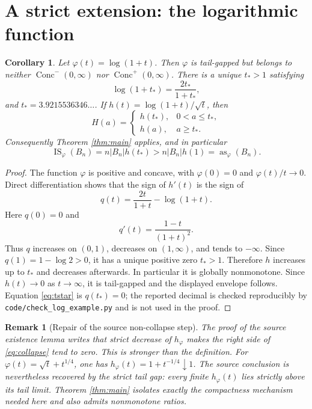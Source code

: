 \documentclass[11pt]{article}
\newtheorem{corollary}[theorem]{Corollary}
\newtheorem{remark}[theorem]{Remark}
\newcommand{\IS}{\operatorname{IS}}
\newcommand{\as}{\operatorname{as}}
\begin{document}
\section{A strict extension: the logarithmic function}

\begin{corollary}\label{cor:log}
Let $\varphi(t)=\log(1+t)$.  Then $\varphi$ is tail-gapped but belongs to
neither $\operatorname{Conc}^{-}(0,\infty)$ nor
$\operatorname{Conc}^{+}(0,\infty)$.  There is a unique $t_*>1$ satisfying
\begin{equation}\label{eq:tstar}
 \log(1+t_*)=\frac{2t_*}{1+t_*},
\end{equation}
and $t_*=3.9215536346\ldots$.  If
$h(t)=\log(1+t)/\sqrt t$, then
\[
 H(a)=
 \begin{cases}
 h(t_*),&0<a\le t_*,\\
 h(a),&a\ge t_*.
 \end{cases}
\]
Consequently Theorem \ref{thm:main} applies, and in particular
\[
 \IS_\varphi(B_n)=n|B_n|h(t_*)
 >n|B_n|h(1)=\as_\varphi(B_n).
\]
\end{corollary}

\begin{proof}
The function $\varphi$ is positive and concave, with $\varphi(0)=0$ and
$\varphi(t)/t\to0$.  Direct differentiation shows that the sign of $h'(t)$
is the sign of
\[
 q(t)=\frac{2t}{1+t}-\log(1+t).
\]
Here $q(0)=0$ and
\[
 q'(t)=\frac{1-t}{(1+t)^2}.
\]
Thus $q$ increases on $(0,1)$, decreases on $(1,\infty)$, and tends to
$-\infty$.  Since $q(1)=1-\log2>0$, it has a unique positive zero $t_*>1$.
Therefore $h$ increases up to $t_*$ and decreases afterwards.  In particular
it is globally nonmonotone.  Since $h(t)\to0$ as $t\to\infty$, it is
tail-gapped and the displayed envelope follows.  Equation \eqref{eq:tstar}
is $q(t_*)=0$; the reported decimal is checked reproducibly by
\texttt{code/check\_log\_example.py} and is not used in the proof.
\end{proof}

\begin{remark}[Repair of the source non-collapse step]
The proof of the source existence lemma writes that strict decrease of
$h_\varphi$ makes the right side of \eqref{eq:collapse} tend to zero.  This is
stronger than the definition.  For
$\varphi(t)=\sqrt t+t^{1/4}$, one has
$h_\varphi(t)=1+t^{-1/4}\downarrow1$.  The source conclusion is nevertheless
recovered by the strict tail gap: every finite $h_\varphi(t)$ lies strictly
above its tail limit.  Theorem \ref{thm:main} isolates exactly the compactness
mechanism needed here and also admits nonmonotone ratios.
\end{remark}
\end{document}
